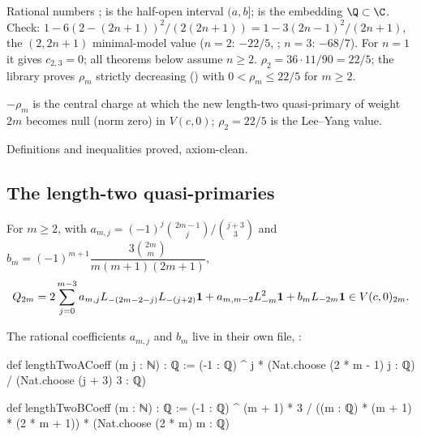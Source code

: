 \begin{dictionary}
Rational numbers ;  is the half-open interval $(a,b]$;  is the
embedding $\Q\subset\C$. Check: $1-6(2-(2n+1))^2/(2(2n+1)) = 1-3(2n-1)^2/(2n+1)$, the $(2,2n+1)$
minimal-model value ($n=2$: $-22/5$, \allowbreak{}\allowbreak{}\allowbreak{}; $n=3$: $-68/7$). For $n=1$ it
gives $c_{2,3} = 0$; all theorems below assume $n\ge2$. $\rho_2 = 36\cdot11/90 = 22/5$; the library proves
$\rho_m$ strictly decreasing () with $0<\rho_m\le22/5$ for $m\ge2$.
\end{dictionary}

\begin{physics}
$-\rho_m$ is the central charge at which the new length-two quasi-primary of weight $2m$ becomes null
(norm zero) in $V(c,0)$; $\rho_2 = 22/5$ is the Lee--Yang value.
\end{physics}

\begin{status}
Definitions and inequalities proved, axiom-clean.
\end{status}

\subsection{The length-two quasi-primaries}

\begin{definition}[$Q_{2m}$]\label{l19:def:Q}
For $m\ge2$, with $a_{m,j} = (-1)^j\binom{2m-1}{j}/\binom{j+3}{3}$ and
$b_m = (-1)^{m+1}\dfrac{3\binom{2m}{m}}{m(m+1)(2m+1)}$,
\begin{equation*}
 Q_{2m} = 2\sum_{j=0}^{m-3}a_{m,j}L_{-(2m-2-j)}L_{-(j+2)}\mathbf{1} + a_{m,m-2}L_{-m}^2\mathbf{1} +
 b_mL_{-2m}\mathbf{1}\in V(c,0)_{2m}.
\end{equation*}
\end{definition}

\noindent The rational coefficients $a_{m,j}$ and $b_m$ live in their own file,
:
\begin{leancode}
def lengthTwoACoeff (m j : ℕ) : ℚ :=
  (-1 : ℚ) ^ j * (Nat.choose (2 * m - 1) j : ℚ) / (Nat.choose (j + 3) 3 : ℚ)

def lengthTwoBCoeff (m : ℕ) : ℚ :=
  (-1 : ℚ) ^ (m + 1) * 3 / ((m : ℚ) * (m + 1) * (2 * m + 1)) *
    (Nat.choose (2 * m) m : ℚ)
\end{leancode}

